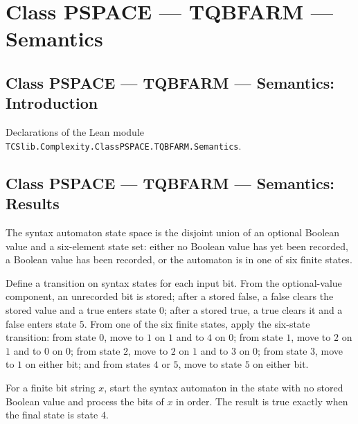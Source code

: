 \section{Class PSPACE --- TQBFARM --- Semantics}
\subsection*{Class PSPACE --- TQBFARM --- Semantics: Introduction}

Declarations of the Lean module \texttt{TCSlib.Complexity.ClassPSPACE.TQBFARM.Semantics}.

\subsection*{Class PSPACE --- TQBFARM --- Semantics: Results}

\begin{definition}
\label{Complexity.LogProg.TQBFARM.SynSt}
\leanok
The syntax automaton state space is the disjoint union of an optional Boolean value and
a six-element state set: either no Boolean value has yet been recorded, a Boolean value
has been recorded, or the automaton is in one of six finite states.
\end{definition}

\begin{definition}
\label{Complexity.LogProg.TQBFARM.synStep}
\leanok
{}
Define a transition on syntax states for each input bit. From the optional-value
component, an unrecorded bit is stored; after a stored false, a false clears the stored
value and a true enters state $0$; after a stored true, a true clears it and a false
enters state $5$. From one of the six finite states, apply the six-state transition:
from state $0$, move to $1$ on $1$ and to $4$ on $0$; from state $1$, move to $2$ on $1$
and to $0$ on $0$; from state $2$, move to $2$ on $1$ and to $3$ on $0$; from state $3$,
move to $1$ on either bit; and from states $4$ or $5$, move to state $5$ on either bit.
\end{definition}

\begin{definition}
\label{Complexity.LogProg.TQBFARM.synOK}
\leanok
{}
For a finite bit string $x$, start the syntax automaton in the state with no stored
Boolean value and process the bits of $x$ in order. The result is true exactly when the
final state is state $4$.
\end{definition}

